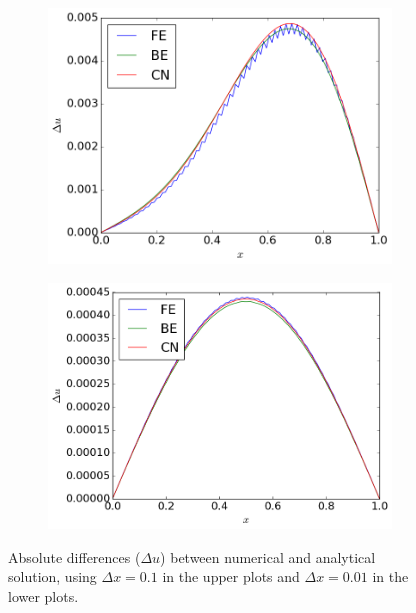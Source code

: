 \documentclass[12pt, a4paper]{article}
\begin{document}
\begin{figure}[ht!]
\begin{subfigure}[b]{0.495\textwidth}
		\includegraphics[width=\textwidth]{../Programs/Output/Delta_t1_1d_99.png}
  	\end{subfigure}
  	\begin{subfigure}[b]{0.495\textwidth}
		\includegraphics[width=\textwidth]{../Programs/Output/Delta_t2_1d_99.png}
  	\end{subfigure}
  	\caption{Absolute differences ($\Delta u$) between numerical and analytical solution, 
  	using $\Delta x = 0.1$ in the upper plots and $\Delta x = 0.01$ in the lower plots.}
  	\label{fig:1d_diff}	
\end{figure}
\end{document}
